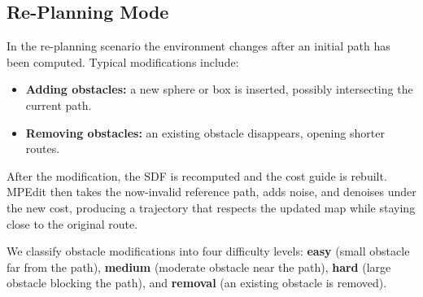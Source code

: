 \documentclass[12pt]{article}
\begin{document}
\begin{algorithm}[t]
\caption{MPEdit: SDEdit-style path regeneration}
\label{alg:sdedit}
\begin{algorithmic}[1]
\REQUIRE Reference path $\tau_\text{ref}$, noise level $t_0$, modified
         environment SDF, number of samples~$N$
\STATE $\mathbf{c}_0 \gets \text{PathToCtrlPts}(\tau_\text{ref})$
\STATE $\mathbf{c}_0 \gets \text{Normalize}(\mathbf{c}_0)$
  \STATE $\epsilon \sim \mathcal{N}(0, \mathbf{I})$
  \STATE $\mathbf{c}_{t_0}^{(i)} \gets \sqrt{\bar\alpha_{t_0}}\,\mathbf{c}_0
         + \sqrt{1 - \bar\alpha_{t_0}}\,\epsilon$
\ENDFOR
{}
  \STATE $\hat\epsilon \gets \epsilon_\theta(\mathbf{c}_t^{(1{:}N)}, t, \mathbf{z})$  \hfill $\triangleright$ \textit{batched}
  \STATE $\mathbf{c}_{t-1}^{(1{:}N)} \gets \text{DDIMStep}(\mathbf{c}_t^{(1{:}N)}, \hat\epsilon)
         - \eta\,\nabla_{\mathbf{c}_t}\mathcal{J}_\text{coll}}$
  \STATE Clamp start/goal control points
\ENDFOR
\STATE $\mathbf{c}_0^{(1{:}N)} \gets \text{Unnormalize}(\mathbf{c}_0^{(1{:}N)})$
\STATE $\mathcal{T} \gets \{\tau^{(i)} \mid \tau^{(i)}
       = \text{BSpline}(\mathbf{c}_0^{(i)}),\;
       \text{collision-free}\}$
\RETURN $\arg\min_{\tau\in\mathcal{T}} \text{PathLength}(\tau)$
\end{algorithmic}
\end{algorithm}

\subsection{Re-Planning Mode}
\label{sec:replan}

In the re-planning scenario the environment changes after an initial path has
been computed.  Typical modifications include:
\begin{itemize}
  \item \textbf{Adding obstacles:} a new sphere or box is inserted, possibly
        intersecting the current path.
  \item \textbf{Removing obstacles:} an existing obstacle disappears, opening
        shorter routes.
\end{itemize}
After the modification, the SDF is recomputed and the cost guide is rebuilt.
MPEdit then takes the now-invalid reference path, adds noise, and denoises
under the new cost, producing a trajectory that respects the updated map while
staying close to the original route.

We classify obstacle modifications into four difficulty levels:
\textbf{easy} (small obstacle far from the path), \textbf{medium}
(moderate obstacle near the path), \textbf{hard} (large obstacle blocking
the path), and \textbf{removal} (an existing obstacle is removed).
\end{document}

